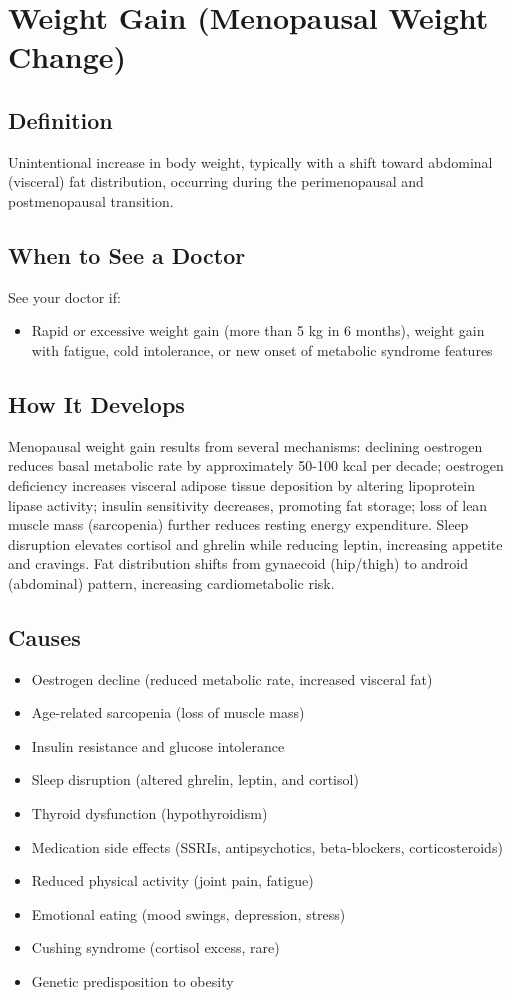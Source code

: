 \chapter{Weight Gain (Menopausal Weight Change)}

\section*{Definition}
Unintentional increase in body weight, typically with a shift toward abdominal (visceral) fat distribution, occurring during the perimenopausal and postmenopausal transition.

\section*{When to See a Doctor}
See your doctor if:
\begin{itemize}
  \item Rapid or excessive weight gain (more than 5 kg in 6 months), weight gain with fatigue, cold intolerance, or new onset of metabolic syndrome features
\end{itemize}

\section*{How It Develops}
Menopausal weight gain results from several mechanisms: declining oestrogen reduces basal metabolic rate by approximately 50-100 kcal per decade; oestrogen deficiency increases visceral adipose tissue deposition by altering lipoprotein lipase activity; insulin sensitivity decreases, promoting fat storage; loss of lean muscle mass (sarcopenia) further reduces resting energy expenditure. Sleep disruption elevates cortisol and ghrelin while reducing leptin, increasing appetite and cravings. Fat distribution shifts from gynaecoid (hip/thigh) to android (abdominal) pattern, increasing cardiometabolic risk.

\section*{Causes}
\begin{itemize}
  \item Oestrogen decline (reduced metabolic rate, increased visceral fat)
  \item Age-related sarcopenia (loss of muscle mass)
  \item Insulin resistance and glucose intolerance
  \item Sleep disruption (altered ghrelin, leptin, and cortisol)
  \item Thyroid dysfunction (hypothyroidism)
  \item Medication side effects (SSRIs, antipsychotics, beta-blockers, corticosteroids)
  \item Reduced physical activity (joint pain, fatigue)
  \item Emotional eating (mood swings, depression, stress)
  \item Cushing syndrome (cortisol excess, rare)
  \item Genetic predisposition to obesity
\end{itemize}


